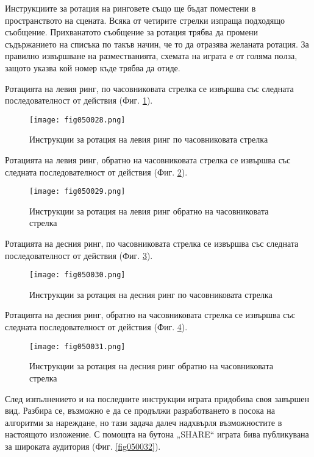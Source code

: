 Инструкциите за ротация на ринговете също ще бъдат поместени в пространството на сцената. Всяка от четирите стрелки изпраща подходящо съобщение. Прихванатото съобщение за ротация трябва да промени съдържанието на списъка по такъв начин, че то да отразява желаната ротация. За правилно извършване на разместванията, схемата на играта е от голяма полза, защото указва кой номер къде трябва да отиде. 

Ротацията на левия ринг, по часовниковата стрелка се извършва със следната последователност от действия (Фиг. \ref{fig050028}).

\begin{figure}[H]
  \centering
  \texttt{[image: fig050028.png]}
  \caption{Инструкции за ротация на левия ринг по часовниковата стрелка}
\label{fig050028}
\end{figure}

Ротацията на левия ринг, обратно на часовниковата стрелка се извършва със следната последователност от действия (Фиг. \ref{fig050029}).

\begin{figure}[H]
  \centering
  \texttt{[image: fig050029.png]}
  \caption{Инструкции за ротация на левия ринг обратно на часовниковата стрелка}
\label{fig050029}
\end{figure}

Ротацията на десния ринг, по часовниковата стрелка се извършва със следната последователност от действия (Фиг. \ref{fig050030}).

\begin{figure}[H]
  \centering
  \texttt{[image: fig050030.png]}
  \caption{Инструкции за ротация на десния ринг по часовниковата стрелка}
\label{fig050030}
\end{figure}

Ротацията на десния ринг, обратно на часовниковата стрелка се извършва със следната последователност от действия (Фиг. \ref{fig050031}).

\begin{figure}[H]
  \centering
  \texttt{[image: fig050031.png]}
  \caption{Инструкции за ротация на десния ринг обратно на часовниковата стрелка}
\label{fig050031}
\end{figure}

След изпълнението и на последните инструкции играта придобива своя завършен вид. Разбира се, възможно е да се продължи разработването в посока на алгоритми за нареждане, но тази задача далеч надхвърля възможностите в настоящото изложение. С помощта на бутона „SHARE“ играта бива публикувана за широката аудитория (Фиг. \ref{fig050032}).

